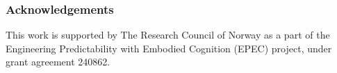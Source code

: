 \documentclass[sigchi]{acmart} %
\begin{document}
\subsubsection*{Acknowledgements}
This work is supported by The Research Council of Norway as
a part of the Engineering Predictability with Embodied Cognition
(EPEC) project, under grant agreement 240862.



\end{document}
